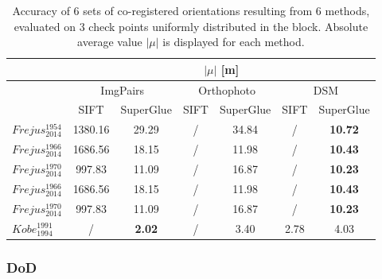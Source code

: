 \begin{table}%
    \footnotesize
    \centering
    \begin{tabular}{|l|c|c|c|c|c|c|}\hline
        &\multicolumn{6}{c|}{$|\mu|$ [m]}\\\hline
        &\multicolumn{2}{c|}{ImgPairs} &\multicolumn{2}{c|}{Orthophoto} &\multicolumn{2}{c|}{DSM}\\\hline
        & SIFT & SuperGlue & SIFT & SuperGlue & SIFT & SuperGlue \\\hline\hline
        $Frejus_{2014}^{1954}$ & 1380.16 & 29.29 & / & 34.84 & / & \textbf{10.72}\\\hline
        $Frejus_{2014}^{1966}$ & 1686.56 & 18.15 & / & 11.98 & / & \textbf{10.43}\\\hline
        $Frejus_{2014}^{1970}$ & 997.83 & 11.09 & / & 16.87 & / & \textbf{10.23}\\\hline\hline

        $Frejus_{2014}^{1966}$ & 1686.56 & 18.15 & / & 11.98 & / & \textbf{10.43}\\\hline
$Frejus_{2014}^{1970}$ & 997.83 & 11.09 & / & 16.87 & / & \textbf{10.23}\\\hline\hline

        $Kobe_{1994}^{1991}$ & / & \textbf{2.02} & / & 3.40 & 2.78 & 4.03 \\\hline
\end{tabular}
    \caption{Accuracy of 6 sets of co-registered orientations resulting from 6 methods, evaluated on 3 check points uniformly distributed in the block. Absolute average value $|\mu|$ is displayed for each method.}
    \label{CheckptAcuracy}
\end{table}

\subsubsection{DoD}



